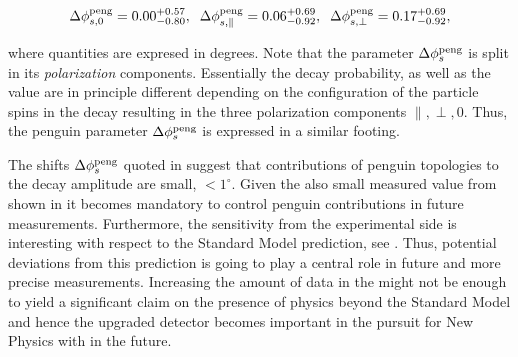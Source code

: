 \begin{equation}
\label{app_delta_phis_result}
  \Delta\phi^{\rm peng}_{s,{0}}         = 0.00 ^{+0.57}_{-0.80}, \;\;
  \Delta\phi^{\rm peng}_{s,{\parallel}} = 0.06 ^{+0.69}_{-0.92}, \;\;
  \Delta\phi^{\rm peng}_{s,{\perp}}     = 0.17 ^{+0.69}_{-0.92},
\end{equation}


\noindent where quantities are expresed in degrees. Note that the parameter $\Delta\phi_{s}^{\tiny\text{peng}}$ is split in its {\it polarization}
components. Essentially the \BsJpsiPhi decay probability, as well as the \phis value
are in principle different depending on the configuration of the particle spins in the \BsJpsiPhi
decay resulting in the three polarization components $\parallel,\perp,0$. Thus, the penguin parameter
$\Delta\phi_{s}^{\tiny\text{peng}}$ is expressed in a similar footing.

The shifts $\Delta\phi_{s}^{\tiny\text{peng}}$ quoted in 
suggest that contributions of penguin topologies to the \BsJpsiPhi decay amplitude are
small, $<1^\circ$. Given the also small \phis measured value from \lhcb shown in 
it becomes mandatory to control penguin contributions in future \phis measurements.
Furthermore, the sensitivity from the experimental side is interesting with respect to
the Standard Model prediction, see . Thus, potential deviations from this
prediction is going to play a central role in future and more precise \phis measurements.
Increasing the amount of data in the \lhc \runtwo might not be enough to yield
a significant claim on the presence of physics beyond the Standard Model and hence
the upgraded \lhcb detector becomes important in the pursuit for New Physics with \phis in the future.
